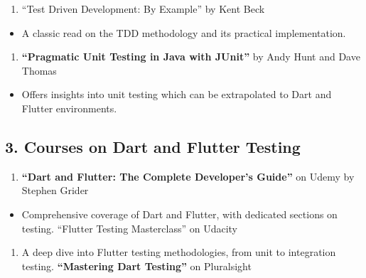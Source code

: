 \documentclass[
]{article}
\providecommand{\tightlist}{%
  \setlength{\itemsep}{0pt}\setlength{\parskip}{0pt}}
\begin{document}
\begin{enumerate}
\def\labelenumi{\arabic{enumi}.}
\setcounter{enumi}{1}
\tightlist
\item
  ``Test Driven Development: By Example'' by Kent Beck
\end{enumerate}

\begin{itemize}
\tightlist
\item
  A classic read on the TDD methodology and its practical
  implementation.
\end{itemize}

\begin{enumerate}
\def\labelenumi{\arabic{enumi}.}
\setcounter{enumi}{2}
\tightlist
\item
  \textbf{``Pragmatic Unit Testing in Java with JUnit''} by Andy Hunt
  and Dave Thomas
\end{enumerate}

\begin{itemize}
\tightlist
\item
  Offers insights into unit testing which can be extrapolated to Dart
  and Flutter environments.
\end{itemize}

\subsection{3. Courses on Dart and Flutter
Testing}\label{courses-on-dart-and-flutter-testing}

\begin{enumerate}
\def\labelenumi{\arabic{enumi}.}
\tightlist
\item
  \textbf{``Dart and Flutter: The Complete Developer's Guide''} on Udemy
  by Stephen Grider
\end{enumerate}

\begin{itemize}
\tightlist
\item
  Comprehensive coverage of Dart and Flutter, with dedicated sections on
  testing. ``Flutter Testing Masterclass'' on Udacity
\end{itemize}

\begin{enumerate}
\def\labelenumi{\arabic{enumi}.}
\setcounter{enumi}{1}
\tightlist
\item
  A deep dive into Flutter testing methodologies, from unit to
  integration testing. \textbf{``Mastering Dart Testing''} on
  Pluralsight
\end{enumerate}
\end{document}
